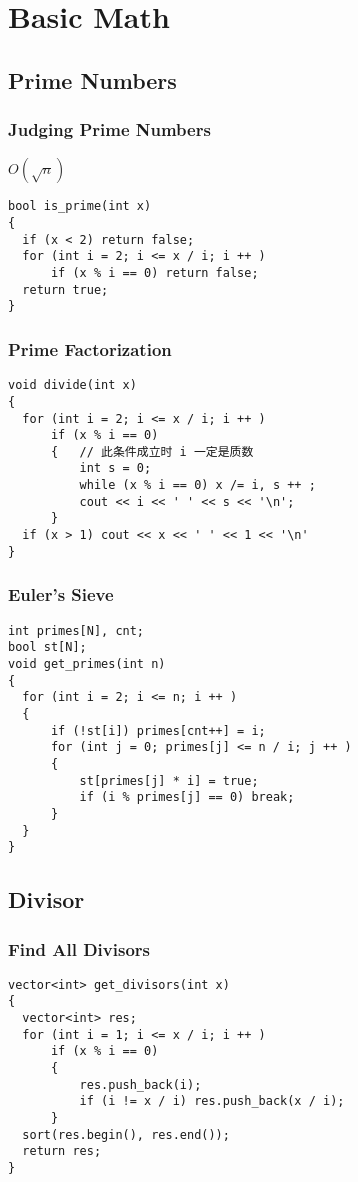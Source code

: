 \chapter{Basic Math}\label{chap:BasicMath}
\section{Prime Numbers}
\subsection{Judging Prime Numbers}
$O(\sqrt{n})$
\begin{lstlisting}
bool is_prime(int x)
{
  if (x < 2) return false;
  for (int i = 2; i <= x / i; i ++ )
      if (x % i == 0) return false;
  return true;
}
\end{lstlisting}
\subsection{Prime Factorization}
\begin{lstlisting}
void divide(int x)
{
  for (int i = 2; i <= x / i; i ++ )
      if (x % i == 0)
      {   // 此条件成⽴时 i ⼀定是质数
          int s = 0;
          while (x % i == 0) x /= i, s ++ ;
          cout << i << ' ' << s << '\n';
      }
  if (x > 1) cout << x << ' ' << 1 << '\n'
}
\end{lstlisting}
\subsection{Euler's Sieve}
\begin{lstlisting}
int primes[N], cnt;
bool st[N]; 
void get_primes(int n)
{
  for (int i = 2; i <= n; i ++ )
  {
      if (!st[i]) primes[cnt++] = i;
      for (int j = 0; primes[j] <= n / i; j ++ )
      {
          st[primes[j] * i] = true;
          if (i % primes[j] == 0) break;
      }
  }
}
\end{lstlisting}
\section{Divisor}
\subsection{Find All Divisors}
\begin{lstlisting}
vector<int> get_divisors(int x)
{
  vector<int> res;
  for (int i = 1; i <= x / i; i ++ )
      if (x % i == 0)
      {
          res.push_back(i);
          if (i != x / i) res.push_back(x / i);
      }
  sort(res.begin(), res.end());
  return res;
}
\end{lstlisting}
